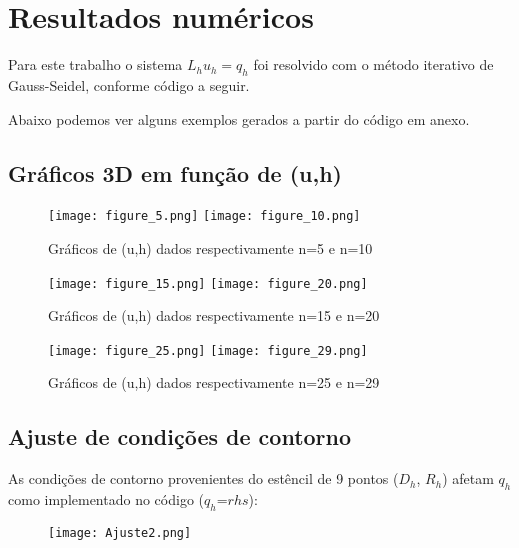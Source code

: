 \documentclass[]{article}
\newcounter{sol}[section]
\begin{document}
\section{Resultados numéricos}

Para este trabalho o sistema $L_h u_h = q_h$ foi resolvido com o método iterativo de Gauss-Seidel, conforme código a seguir.

Abaixo podemos ver alguns exemplos gerados a partir do código em anexo.

\subsection{Gráficos 3D em função de (u,h)}

\begin{figure}[H]
\begin{center}
	\texttt{[image: figure\_5.png]} \quad
	\texttt{[image: figure\_10.png]}
\caption{Gráficos de (u,h) dados respectivamente n=5 e n=10} \label{graf1}
\end{center}
\end{figure}

\begin{figure}[H]
\begin{center}
	\texttt{[image: figure\_15.png]} \quad
	\texttt{[image: figure\_20.png]}
\caption{Gráficos de (u,h) dados respectivamente n=15 e n=20} \label{graf2}
\end{center}
\end{figure}

\begin{figure}[H]
\begin{center}
	\texttt{[image: figure\_25.png]} \quad
	\texttt{[image: figure\_29.png]}
\caption{Gráficos de (u,h) dados respectivamente n=25 e n=29} \label{graf3}
\end{center}
\end{figure}

\break
\subsection{Ajuste de condições de contorno}

As condições de contorno provenientes do estêncil de 9  pontos  ($D_h$, $R_h$)  afetam $q_h$  como implementado no código ($q_h$=$rhs$):

\begin{figure}[!h]
\texttt{[image: Ajuste2.png]}
\centering 
\label{fig1}
\end{figure}
\end{document}
